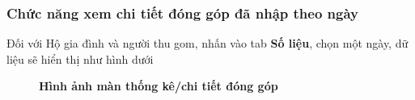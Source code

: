 \subsubsection{Chức năng xem chi tiết đóng góp đã nhập theo ngày}
Đối với Hộ gia đình và người thu gom, nhấn vào tab \textbf{Số liệu}, chọn một ngày, dữ liệu sẽ hiển thị như hình dưới
\begin{figure}[H]
  \centering
  \hfill
  \caption[Hình ảnh màn thống kê/chi tiết đóng góp]{\bfseries \fontsize{12pt}{0pt}
  \selectfont Hình ảnh màn thống kê/chi tiết đóng góp}
  \label{contribution_screen_waznet}
\end{figure}

